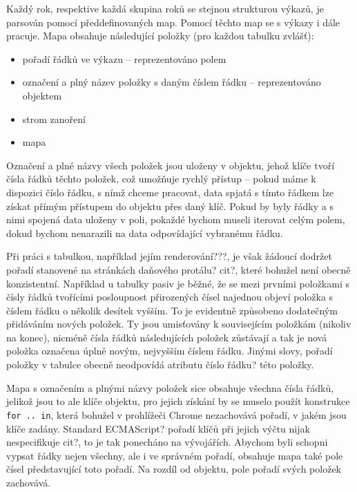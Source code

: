 Každý rok, respektive každá skupina roků se stejnou strukturou výkazů, je parsován pomocí předdefinovaných map. Pomocí těchto map se s výkazy i dále pracuje. Mapa obsahuje následující položky (pro každou tabulku zvlášť):

\begin{itemize}
\item pořadí řádků ve výkazu -- reprezentováno polem
\item označení a plný název položky s daným číslem řádku -- reprezentováno objektem
\item strom zanoření
\item mapa 
\end{itemize} 

Označení a plné názvy všech položek jsou uloženy v objektu, jehož klíče tvoří čísla řádků těchto položek, což umožňuje rychlý přístup -- pokud máme k dispozici číslo řádku, s nímž chceme pracovat, data spjatá s tímto řádkem lze získat přímým přístupem do objektu přes daný klíč. Pokud by byly řádky a s nimi spojená data uloženy v poli, pokaždé bychom museli iterovat celým polem, dokud bychom nenarazili na data odpovídající vybranému řádku.

Při práci s tabulkou, například jejím renderování???, je však žádoucí dodržet pořadí stanovené na stránkách daňového protálu? cit?, které bohužel není obecně konzistentní. Například u tabulky pasiv je běžné, že se mezi prvními položkami s čísly řádků tvořícími posloupnost přirozených čísel najednou objeví položka s číslem řádku o několik desítek vyšším. To je evidentně způsobeno dodatečným přidáváním nových položek. Ty jsou umisťovány k souvisejícím položkám (nikoliv na konec), nicméně čísla řádků následujících položek zůstávají a tak je nová položka označena úplně novým, nejvyšším číslem řádku. Jinými slovy, pořadí položky v tabulce obecně neodpovídá atributu číslo řádku? této položky. 


Mapa s označením a plnými názvy položek sice obsahuje všechna čísla řádků, jelikož jsou to ale klíče objektu, pro jejich získání by se muselo použít konstrukce \texttt{for .. in}, která bohužel v prohlížeči Chrome nezachovává pořadí, v jakém jsou klíče zadány. Standard ECMAScript? pořadí klíčů při jejich výčtu nijak nespecifikuje cit?, to je tak ponecháno na vývojářích. Abychom byli schopni vypsat řádky nejen všechny, ale i ve správném pořadí, obsahuje mapa také pole čísel představující toto pořadí. Na rozdíl od objektu, pole pořadí svých položek zachovává.

